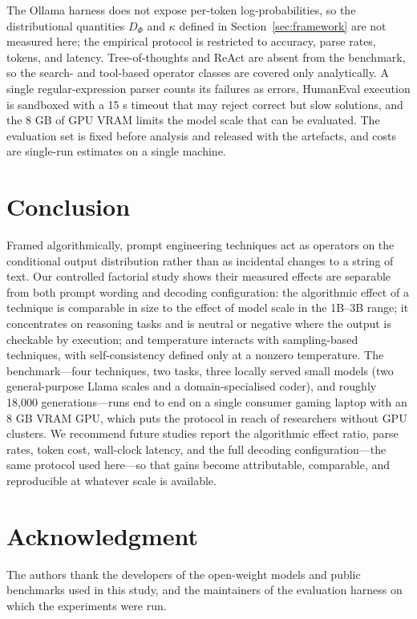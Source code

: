 \documentclass[conference]{IEEEtran}
\begin{document}
The Ollama harness does not expose per-token log-probabilities, so
the distributional quantities $D_{\Phi}$ and $\kappa$ defined in
Section~\ref{sec:framework} are not measured here; the empirical
protocol is restricted to accuracy, parse rates, tokens, and latency.
Tree-of-thoughts and ReAct are absent from the benchmark, so the
search- and tool-based operator classes are covered only
analytically.  A single regular-expression parser counts its
failures as errors, HumanEval execution is sandboxed with a 15 s
timeout that may reject correct but slow solutions, and the 8 GB of
GPU VRAM limits the model scale that can be evaluated.  The
evaluation set is fixed before analysis and released with the
artefacts, and costs are single-run estimates on a single machine.

\section{Conclusion}
\label{sec:conclusion}

Framed algorithmically, prompt engineering techniques act as
operators on the conditional output distribution rather than as
incidental changes to a string of text.  Our controlled factorial
study shows their measured effects are separable from both prompt
wording and decoding configuration: the algorithmic effect of a
technique is comparable in size to the effect of model scale in the
1B--3B range; it concentrates on reasoning tasks and is neutral or
negative where the output is checkable by execution; and temperature
interacts with sampling-based techniques, with self-consistency
defined only at a nonzero temperature.  The benchmark---four
techniques, two tasks, three locally served small models (two
general-purpose Llama scales and a domain-specialised coder), and
roughly 18,000 generations---runs end to end on a single consumer
gaming laptop with an 8 GB VRAM GPU, which puts the protocol in
reach of researchers without GPU clusters.  We recommend future
studies report the algorithmic effect ratio, parse rates, token cost,
wall-clock latency, and the full decoding configuration---the same
protocol used here---so that gains become attributable, comparable,
and reproducible at whatever scale is available.

\section*{Acknowledgment}
The authors thank the developers of the open-weight models and public
benchmarks used in this study, and the maintainers of the evaluation
harness on which the experiments were run.
\end{document}
